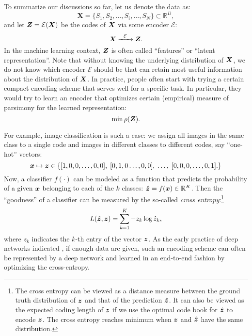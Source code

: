 \documentclass[\toplevelprefix/book-main.tex]{subfiles}
\begin{document}
\label{sec:consistency}
To summarize our discussions so far, let us denote the data as:
\begin{equation}
    \boldsymbol{X} = \{S_1, S_2, \ldots, S_i, \ldots, S_N\} \subset \mathbb{R}^D,
\end{equation}
and let $\boldsymbol{Z} = \mathcal{E}(\bm{X})$ be the codes of $\bm{X}$ via some encoder $\mathcal{E}$:
\begin{equation}
    \bm{X}  \xrightarrow{\hspace{2mm} \mathcal{E}\hspace{2mm}} \bm{Z}.
    \label{eqn:open-loop}
\end{equation}
In the machine learning context, $\bm{Z}$ is often called ``features'' or ``latent representation''. Note that without knowing the underlying distribution of $\bm{X}$, we do not know which encoder $\mathcal{E}$ should be that can retain most useful information about the distribution of $\bm{X}$. In practice, people often start with trying a certain compact encoding scheme that serves well for a specific task. In particular, they would try to learn an encoder that optimizes certain (empirical) measure of parsimony for the learned representation:
\begin{equation}
    \min \rho(\bm{Z}). 
\end{equation}

\begin{example}
For example, image classification is such a case: we assign all images in the same class to a single code and images in different classes to different codes, say ``one-hot'' vectors:
\begin{equation}
  \bm{x} \mapsto \bm{z} \in \{  [1, 0, 0, \ldots , 0, 0], \;  [0, 1, 0 \ldots, 0, 0], \; \ldots, \;  [0,0,0, \ldots, 0, 1].\}
  \label{eqn:class-labels}
\end{equation}
Now, a classifier $f(\cdot)$ can be modeled as a function that predicts the probability of a given $\bm{x}$ belonging to each of the $k$ classes: $\hat{\bm{z}} = f(\bm{x}) \in \mathbb{R}^K$. Then the ``goodness'' of a classifier can be measured by the so-called {\em cross entropy}:\footnote{The cross entropy can be viewed as a distance measure between the ground truth distribution of $\bm{z}$ and that of the prediction $\hat{\bm{z}}$. It can also be viewed as the expected coding length of $\bm{z}$ if we use the optimal code book for $\hat {\bm{z}}$ to encode $\bm{z}$. The cross entropy reaches minimum when $\bm{z}$ and $\hat {\bm{z}}$ have the same distribution.}
\begin{equation}
    L(\hat{\bm{z}}, \bm{z}) = \sum_{k=1}^K - z_k \log \hat{z}_k,
\end{equation}
where $z_k$ indicates the $k$-th entry of the vector $\bm{z}$. As the early practice of deep networks indicated \cite{krizhevsky2012imagenet}, if enough data are given, such an encoding scheme can often be represented by a deep network and learned in an end-to-end fashion by optimizing the cross-entropy. 
\end{example}
\end{document}
